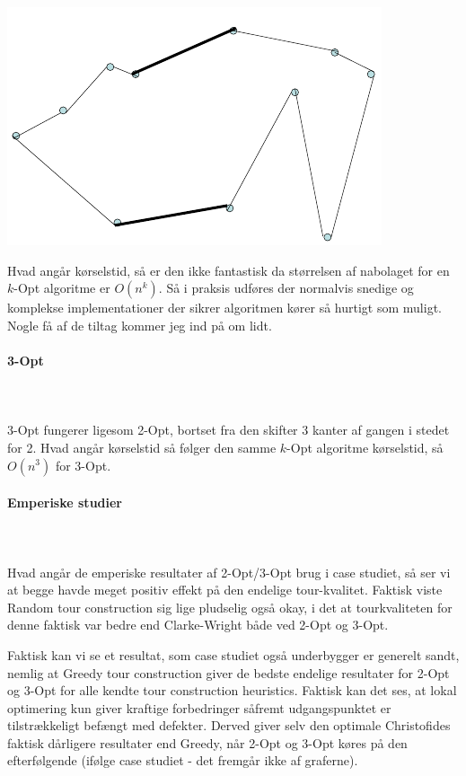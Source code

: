 \begin{center}
 \includegraphics[bb=0 0 313 204,scale=0.5]{img/2opt3.png}
\end{center}

Hvad angår kørselstid, så er den ikke fantastisk da størrelsen af nabolaget for en $k$-Opt algoritme er $O(n^k)$. Så i praksis udføres der normalvis snedige og komplekse implementationer der sikrer algoritmen kører så hurtigt som muligt. Nogle få af de tiltag kommer jeg ind på om lidt.


\paragraph{3-Opt}
~\\
~\\
3-Opt fungerer ligesom 2-Opt, bortset fra den skifter 3 kanter af gangen i stedet for 2. Hvad angår kørselstid så følger den samme $k$-Opt algoritme kørselstid, så $O(n^3)$ for 3-Opt.


\paragraph{Emperiske studier}
~\\
~\\
Hvad angår de emperiske resultater af 2-Opt/3-Opt brug i case studiet, så ser vi at begge havde meget positiv effekt på den endelige tour-kvalitet. Faktisk viste Random tour construction sig lige pludselig også okay, i det at tourkvaliteten for denne faktisk var bedre end Clarke-Wright både ved 2-Opt og 3-Opt. 

Faktisk kan vi se et resultat, som case studiet også underbygger er generelt sandt, nemlig at Greedy tour construction giver de bedste endelige resultater for 2-Opt og 3-Opt for alle kendte tour construction heuristics. Faktisk kan det ses, at lokal optimering kun giver kraftige forbedringer såfremt udgangspunktet er tilstrækkeligt befængt med defekter. Derved giver selv den optimale Christofides faktisk dårligere resultater end Greedy, når 2-Opt og 3-Opt køres på den efterfølgende (ifølge case studiet - det fremgår ikke af graferne).


